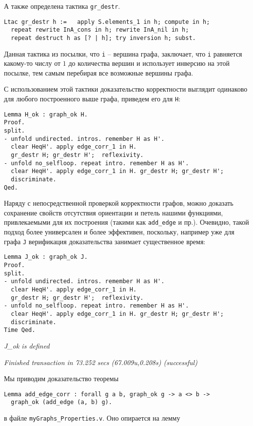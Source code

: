 А также определена тактика {\tt gr\_destr}.

\begin {verbatim}
Ltac gr_destr h :=   apply S.elements_1 in h; compute in h;
  repeat rewrite InA_cons in h; rewrite InA_nil in h;
  repeat destruct h as [? | h]; try inversion h; subst.
\end{verbatim}

Данная тактика из посылки, что {\tt i} -- вершина графа, заключает, что {\tt i} равняется какому-то числу от $1$ до количества вершин и использует инверсию на этой посылке, тем самым перебирая все возможные вершины графа.

С использованием этой тактики доказательство корректности выглядит одинаково для любого построенного выше графа, приведем его для {\tt H}:

\begin{verbatim}
Lemma H_ok : graph_ok H.
Proof.
split.
- unfold undirected. intros. remember H as H'.
  clear HeqH'. apply edge_corr_1 in H.
  gr_destr H; gr_destr H';  reflexivity.
- unfold no_selfloop. repeat intro. remember H as H'.
  clear HeqH'. apply edge_corr_1 in H. gr_destr H; gr_destr H';
  discriminate.
Qed.
\end{verbatim}

Наряду с непосредственной проверкой корректности графов, можно доказать сохранение свойств отсутствия ориентации и петель нашими функциями, привлекаемыми для их построения (такими как {\tt add\_edge} и пр.). Очевидно, такой подход более универсален и более эффективен, поскольку, например уже для графа {\tt J} верификация доказательства занимает существенное время:

\begin{verbatim}
Lemma J_ok : graph_ok J.
Proof.
split.
- unfold undirected. intros. remember H as H'.
  clear HeqH'. apply edge_corr_1 in H.
  gr_destr H; gr_destr H';  reflexivity.
- unfold no_selfloop. repeat intro. remember H as H'.
  clear HeqH'. apply edge_corr_1 in H. gr_destr H; gr_destr H';
  discriminate.
Time Qed.
\end{verbatim}

{\it J\_ok is defined}

{\it Finished transaction in 73.252 secs (67.009u,0.208s) (successful) }

Мы приводим доказательство теоремы 

\begin{verbatim}
Lemma add_edge_corr : forall g a b, graph_ok g -> a <> b -> 
  graph_ok (add_edge (a, b) g).
\end{verbatim}
в файле {\tt myGraphs\_Properties.v}. Оно опирается на лемму 

